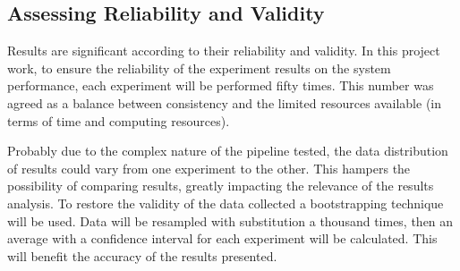 \subsection{Assessing Reliability and Validity}

Results are significant according to their reliability and validity. In this project work, to ensure the reliability of the experiment results on the system performance, each experiment will be performed fifty times. This number was agreed as a balance between consistency and the limited resources available (in terms of time and computing resources).

Probably due to the complex nature of the pipeline tested, the data distribution of results could vary from one experiment to the other. This hampers the possibility of comparing results, greatly impacting the relevance of the results analysis. To restore the validity of the data collected a bootstrapping technique will be used. Data will be resampled with substitution a thousand times, then an average with a confidence interval for each experiment will be calculated. This will benefit the accuracy of the results presented.